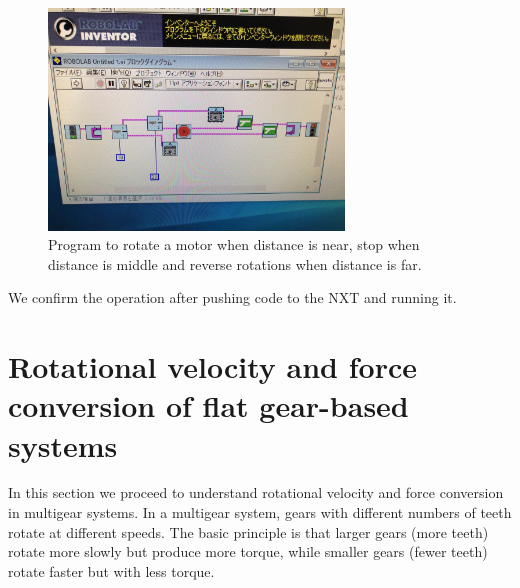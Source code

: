 \documentclass[12pt,a4paper]{report}
\begin{document}
\begin{figure}[htbp]
    \centering
    \includegraphics[width=0.7\textwidth]{figures/ass3-2.jpg}
    \caption{Program to rotate a motor when distance is near, stop when distance is middle and reverse rotations 
    when distance is far.}
    \label{fig:ass3-2}
\end{figure}
We confirm the operation after pushing code to the NXT and running it. 

\section{Rotational velocity and force conversion of flat gear-based systems}
In this section we proceed to understand rotational velocity and force conversion in multigear systems. 
In a multigear system, gears with different numbers of teeth rotate at different speeds. The basic principle is that larger gears (more teeth) rotate more slowly but produce more torque, while smaller gears (fewer teeth) rotate faster but with less torque.
\end{document}
